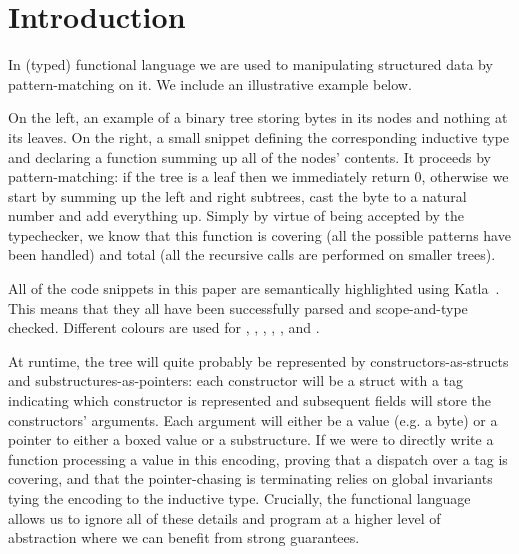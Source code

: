 \section{Introduction}\label{sec:intro}

In (typed) functional language we are used to manipulating
structured data by pattern-matching on it.
We include an illustrative example below.

\noindent
\begin{minipage}{.45\textwidth}
  \begin{center}
    
  \end{center}
\end{minipage}\hfill
\begin{minipage}{.37\textwidth}
  \begin{center}
  \end{center}
\end{minipage}

On the left, an example of a binary tree storing bytes in its nodes and
nothing at its leaves.
%
On the right, a small \idris{} snippet defining the corresponding
inductive type and declaring a function summing up all of the
nodes' contents.
%
It proceeds by pattern-matching:
%
if the tree is a leaf then we immediately return 0,
otherwise we start by summing up the left and right subtrees, cast the
byte to a natural number and add everything up.
%
Simply by virtue of being accepted by the typechecker, we know that
this function is covering (all the possible patterns have been handled)
and total (all the recursive calls are performed on smaller trees).

\begin{remark}
  All of the code snippets in this paper are semantically
  highlighted using Katla~\citep{MANUAL:repo/github/Katla23}.
  This means that they all have been successfully parsed
  and scope-and-type checked.
  Different colours are used for ,
  , ,
  , ,
  and .
\end{remark}

At runtime, the tree will quite probably be represented by
constructors-as-structs and substructures-as-pointers:
%
each constructor will be a struct with a tag indicating which
constructor is represented and subsequent fields will store
the constructors' arguments.
%
Each argument will either be a value (e.g. a byte) or a pointer
to either a boxed value or a substructure.
%
If we were to directly write a function processing a value in this
encoding, proving that a dispatch over a tag is covering, and that
the pointer-chasing is terminating relies on global invariants
tying the encoding to the inductive type.
%
Crucially, the functional language allows us to ignore all of these
details and program at a higher level of abstraction where we can
benefit from strong guarantees.

